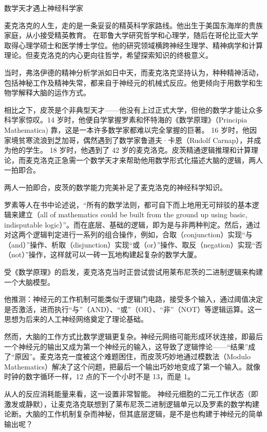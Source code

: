 \begin{story}{数学天才遇上神经科学家}

麦克洛克的人生，走的是一条妥妥的精英科学家路线。他出生于美国东海岸的贵族家庭，从小接受精英教育。
在耶鲁大学研究哲学和心理学，随后在哥伦比亚大学取得心理学硕士和医学博士学位。他的研究领域横跨神经生理学、精神病学和计算理论。但麦克洛克的内心更向往哲学，希望探索知识的终极意义。%

当时，弗洛伊德的精神分析学派如日中天，而麦克洛克坚持认为，种种精神活动，包括神秘工作及精神失常，都来自于神经元的机械式反应。他更倾向于用数学和生物学解释大脑的运作方式。

相比之下，皮茨是个非典型天才——他没有上过正式大学，但他的数学才能让众多科学家惊叹。14 岁时，他便自学掌握罗素和怀特海的《数学原理》（Principia Mathematica) 靠，这是一本许多数学家都难以完全掌握的巨著。
16 岁时，他因家境贫寒流浪到芝加哥，偶然遇到了数学家鲁道夫·卡恩（Rudolf Carnap），并成为他的学生。
18 岁时，他遇到了 42 岁的麦克洛克。皮茨精通逻辑推理和计算理论，而麦克洛克正急需一个数学天才来帮助他用数学形式化描述大脑的逻辑，两人一拍即合。

两人一拍即合，皮茨的数学能力完美补足了麦克洛克的神经科学知识。

罗素等人在书中论述说，“所有的数学法则，都可自下而上地用无可辩驳的基本逻辑来建立（all of mathematics could be built from the ground up using basic, indisputable logic）”。而在底层、基础的逻辑，即为是与非两种判定。然后，通过对这两个逻辑判定进行一系列的组合操作，例如，合取（conjunction）实现“与（and）”操作、析取（disjunction）实现“或（or）”操作、取反（negation）实现“否（not）”操作，这样就可以一砖一瓦地构建起复杂的数学大厦。

受《数学原理》的启发，麦克洛克当时正尝试尝试用莱布尼茨的二进制逻辑来构建一个大脑模型。

他推测：神经元的工作机制可能类似于逻辑门电路，接受多个输入，通过阈值决定是否激活，进而执行“与”（AND）、“或”（OR）、“非”（NOT）等逻辑运算。这一思想为后来的人工神经网络奠定了理论基础。  

然而，大脑的工作方式比数学逻辑更复杂。神经元网络可能形成环状连接，即最后一个神经元的输出又成为第一个神经元的输入，这导致了逻辑悖论——“结果”成了“原因”。麦克洛克一度被这个难题困住，而皮茨巧妙地通过模数法（Modulo Mathematics）解决了这个问题，把最后一个输出巧妙地变成了第一个输入。就像时钟的数字循环一样，12 点的下一个小时不是 13，而是 1。  

从人的反应消耗能量来看，这一设置非常智能。 
神经元细胞的二元工作状态（即激发或静默），让麦克洛克联想到了莱布尼茨二进制逻辑单元以及罗素的数学构建论断。大脑的工作机制复杂而神秘，但其底层逻辑，是不是也构建于神经元的简单输出呢？


\end{story}
